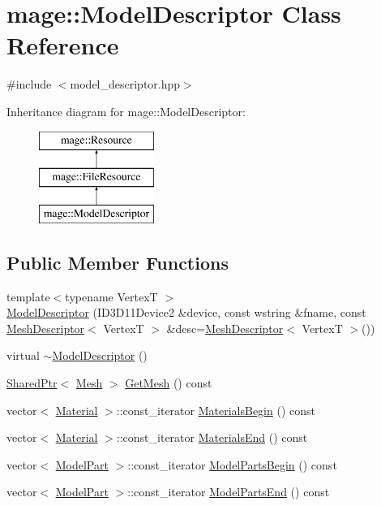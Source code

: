 \hypertarget{classmage_1_1_model_descriptor}{}\section{mage\+:\+:Model\+Descriptor Class Reference}
\label{classmage_1_1_model_descriptor}


{\ttfamily \#include $<$model\+\_\+descriptor.\+hpp$>$}

Inheritance diagram for mage\+:\+:Model\+Descriptor\+:\begin{figure}[H]
\begin{center}
\leavevmode
\includegraphics[height=3.000000cm]{classmage_1_1_model_descriptor}
\end{center}
\end{figure}
\subsection*{Public Member Functions}
\begin{DoxyCompactItemize}
\item 
{\footnotesize template$<$typename VertexT $>$ }\\\hyperlink{classmage_1_1_model_descriptor_a165ff1d3c0360be3ecb19c21c2b49cea}{Model\+Descriptor} (I\+D3\+D11\+Device2 \&device, const wstring \&fname, const \hyperlink{structmage_1_1_mesh_descriptor}{Mesh\+Descriptor}$<$ VertexT $>$ \&desc=\hyperlink{structmage_1_1_mesh_descriptor}{Mesh\+Descriptor}$<$ VertexT $>$())
\item 
virtual \hyperlink{classmage_1_1_model_descriptor_a3bc8ee3d1cb8d2675374727edce3d593}{$\sim$\+Model\+Descriptor} ()
\item 
\hyperlink{namespacemage_a1e01ae66713838a7a67d30e44c67703e}{Shared\+Ptr}$<$ \hyperlink{classmage_1_1_mesh}{Mesh} $>$ \hyperlink{classmage_1_1_model_descriptor_a325f0e58fda7734ace7a0e296e0d970d}{Get\+Mesh} () const
\item 
vector$<$ \hyperlink{structmage_1_1_material}{Material} $>$\+::const\+\_\+iterator \hyperlink{classmage_1_1_model_descriptor_a64a2ca531c03cd8d79eda3a728e6efa1}{Materials\+Begin} () const
\item 
vector$<$ \hyperlink{structmage_1_1_material}{Material} $>$\+::const\+\_\+iterator \hyperlink{classmage_1_1_model_descriptor_a3e1880190d58d4d1bc308766f804047d}{Materials\+End} () const
\item 
vector$<$ \hyperlink{structmage_1_1_model_part}{Model\+Part} $>$\+::const\+\_\+iterator \hyperlink{classmage_1_1_model_descriptor_a721a81fae1d5613af8a3a037577ce454}{Model\+Parts\+Begin} () const
\item 
vector$<$ \hyperlink{structmage_1_1_model_part}{Model\+Part} $>$\+::const\+\_\+iterator \hyperlink{classmage_1_1_model_descriptor_a97f78d3e5a157020f62f5e6003deaac6}{Model\+Parts\+End} () const
\end{DoxyCompactItemize}
